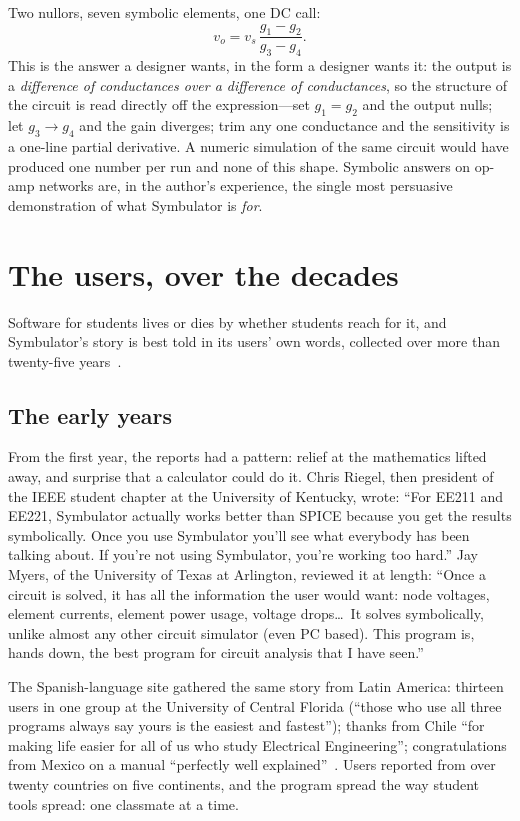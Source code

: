 \documentclass[11pt,oneside]{report}
\begin{document}
\noindent Two nullors, seven symbolic elements, one DC call:
\[
v_o = v_s\,\frac{g_1 - g_2}{g_3 - g_4}.
\]
This is the answer a designer wants, in the form a designer wants it:
the output is a \emph{difference of conductances over a difference of
conductances}, so the structure of the circuit is read directly off
the expression---set $g_1 = g_2$ and the output nulls; let
$g_3 \to g_4$ and the gain diverges; trim any one conductance and the
sensitivity is a one-line partial derivative. A numeric simulation of
the same circuit would have produced one number per run and none of
this shape. Symbolic answers on op-amp networks are, in the author's
experience, the single most persuasive demonstration of what
Symbulator is \emph{for}.

\chapter{The users, over the decades}
\label{ch:users}

Software for students lives or dies by whether students reach for it,
and Symbulator's story is best told in its users' own words, collected
over more than twenty-five years~\cite{paper1999,website2001,
symbulator-docs}.

\section{The early years}

From the first year, the reports had a pattern: relief at the
mathematics lifted away, and surprise that a calculator could do it.
Chris Riegel, then president of the IEEE student chapter at the
University of Kentucky, wrote: ``For EE211 and EE221, Symbulator
actually works better than SPICE because you get the results
symbolically. Once you use Symbulator you'll see what everybody has
been talking about. If you're not using Symbulator, you're working too
hard.'' Jay Myers, of the University of Texas at Arlington, reviewed
it at length: ``Once a circuit is solved, it has all the information
the user would want: node voltages, element currents, element power
usage, voltage drops\ldots\ It solves symbolically, unlike almost any
other circuit simulator (even PC based). This program is, hands down,
the best program for circuit analysis that I have
seen.''~\cite{paper1999}

The Spanish-language site gathered the same story from Latin America:
thirteen users in one group at the University of Central Florida
(``those who use all three programs always say yours is the easiest
and fastest''); thanks from Chile ``for making life easier for all of
us who study Electrical Engineering''; congratulations from Mexico on
a manual ``perfectly well explained''~\cite{website2001}. Users
reported from over twenty countries on five continents, and the
program spread the way student tools spread: one classmate at a time.
\end{document}
